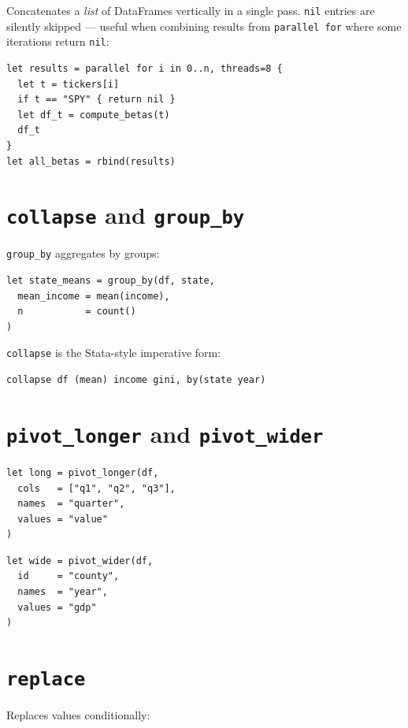 Concatenates a \textit{list} of DataFrames vertically in a single pass.
\texttt{nil} entries are silently skipped --- useful when combining
results from \texttt{parallel for} where some iterations return
\texttt{nil}:

\begin{lstlisting}[caption={rbind with parallel for}]
let results = parallel for i in 0..n, threads=8 {
  let t = tickers[i]
  if t == "SPY" { return nil }
  let df_t = compute_betas(t)
  df_t
}
let all_betas = rbind(results)
\end{lstlisting}

\section{\texttt{collapse} and \texttt{group\_by}}

\lstinline{group_by} aggregates by groups:

\begin{lstlisting}[caption={Aggregation by group}]
let state_means = group_by(df, state,
  mean_income = mean(income),
  n           = count()
)
\end{lstlisting}

\lstinline{collapse} is the Stata-style imperative form:

\begin{lstlisting}
collapse df (mean) income gini, by(state year)
\end{lstlisting}

\section{\texttt{pivot\_longer} and \texttt{pivot\_wider}}

\begin{lstlisting}[caption={Wide to long}]
let long = pivot_longer(df,
  cols   = ["q1", "q2", "q3"],
  names  = "quarter",
  values = "value"
)
\end{lstlisting}

\begin{lstlisting}[caption={Long to wide}]
let wide = pivot_wider(df,
  id     = "county",
  names  = "year",
  values = "gdp"
)
\end{lstlisting}

\section{\texttt{replace}}

Replaces values conditionally:

